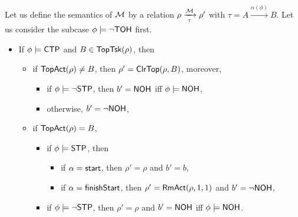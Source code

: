 Let us define the semantics of ${\mathcal{M} }$ by a relation 
$\rho \xrightarrow[\tau]{{\mathcal{M} }} \rho'$ with $\tau = A \xrightarrow{\alpha(\phi)} B$.
Let us consider the subcase $\phi \models \neg {\sf TOH}$ first.

\smallskip
\noindent \fbox{$\phi \models \neg \ntkflag\wedge\neg\ndmflag$}
	\begin{itemize}
		\item If $\phi \models {\sf CTP}$ and $B \in \mathsf{TopTsk}(\rho)$, then 
		\begin{itemize}
			\item if $\mathsf{TopAct}(\rho) \neq B$, then $\rho' = \mathsf{ClrTop}(\rho, B)$, moreover, 
			\begin{itemize}
			\item if $\phi \models \neg {\sf STP}$, then $b' = {\sf NOH}$ iff $\phi \models {\sf NOH}$, 
			\item otherwise, $b' = \neg {\sf NOH}$,
			\end{itemize}
			\item if $\mathsf{TopAct}(\rho) = B$, 
			\begin{itemize}
					\item if $\phi \models {\sf STP}$, then
					\begin{itemize}
						\item if $\alpha = {\mathsf{start} }$, then $\rho' = \rho$ and $b' = b$,
						\item if $\alpha = {\mathsf{finishStart} }$, then $\rho' = \mathsf{RmAct}(\rho, 1, 1)$ and $b' = \neg {\sf NOH}$,
					\end{itemize}
					\item if $\phi \models \neg {\sf STP}$, then $\rho' = \rho$ and $b' = {\sf NOH}$ iff $\phi \models {\sf NOH}$.

\end{itemize}
\end{itemize}
\end{itemize}
